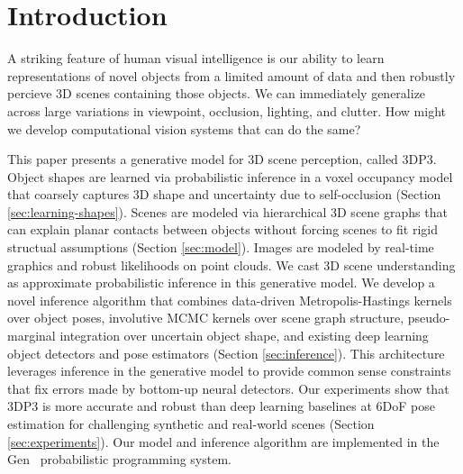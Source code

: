 \section{Introduction}
\vspace{-1mm} 
A striking feature of human visual intelligence is our ability to
learn representations of novel objects from a limited amount of data
and then robustly percieve 3D scenes containing those objects. We can
immediately generalize across large variations in viewpoint,
occlusion, lighting, and clutter. How might we develop computational vision
systems that can do the same?

This paper presents a generative model for 3D scene perception, called
3DP3.  Object shapes are learned via probabilistic inference in a
voxel occupancy model that coarsely captures 3D shape and uncertainty
due to self-occlusion (Section \ref{sec:learning-shapes}). Scenes are modeled via hierarchical 3D scene
graphs that can explain planar contacts between objects without forcing
scenes to fit rigid structual assumptions (Section \ref{sec:model}). Images are modeled by
real-time graphics and robust likelihoods on point clouds. We cast 3D scene understanding as approximate probabilistic
inference in this generative model.  We develop a novel inference
algorithm that combines data-driven Metropolis-Hastings kernels over
object poses, involutive MCMC kernels over scene graph structure,
pseudo-marginal integration over uncertain object shape, and existing
deep learning object detectors and pose estimators (Section \ref{sec:inference}). This architecture
leverages inference in the generative model to provide common sense
constraints that fix errors made by bottom-up neural detectors. Our
experiments show that 3DP3 is more accurate and robust than deep
learning baselines at 6DoF pose estimation for challenging synthetic
and real-world scenes (Section \ref{sec:experiments}). Our model and inference algorithm are implemented in the
Gen~\citep{cusumano2019gen} probabilistic programming system.